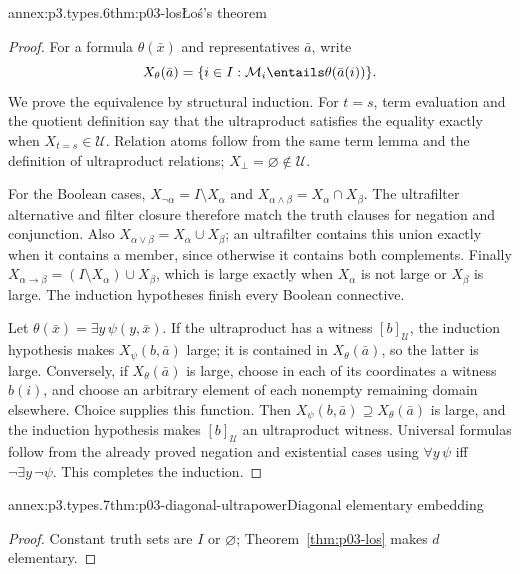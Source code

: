 \begin{annexitem}{annex:p3.types.6}{thm:p03-los}{\L o\'s's theorem}
\begin{proof}
For a formula \(\theta(\bar x)\) and representatives \(\bar a\), write
\[
 X_\theta(\bar a)=
 \{i\in I:\mathcal M_i\entails\theta(\bar a(i))\}.
\]
We prove the equivalence by structural induction.  For \(t=s\), term
evaluation and the quotient definition say that the ultraproduct satisfies
the equality exactly when \(X_{t=s}\in\mathcal U\).  Relation atoms follow
from the same term lemma and the definition of ultraproduct relations;
\(X_\bot=\varnothing\notin\mathcal U\).

For the Boolean cases,
\(X_{\neg\alpha}=I\setminus X_\alpha\) and
\(X_{\alpha\land\beta}=X_\alpha\cap X_\beta\).  The ultrafilter alternative
and filter closure therefore match the truth clauses for negation and
conjunction.  Also
\(X_{\alpha\lor\beta}=X_\alpha\cup X_\beta\); an ultrafilter contains this
union exactly when it contains a member, since otherwise it contains both
complements.  Finally
\(X_{\alpha\to\beta}=(I\setminus X_\alpha)\cup X_\beta\), which is large
exactly when \(X_\alpha\) is not large or \(X_\beta\) is large.  The
induction hypotheses finish every Boolean connective.

Let \(\theta(\bar x)=\exists y\,\psi(y,\bar x)\).  If the ultraproduct has a
witness \([b]_{\mathcal U}\), the induction hypothesis makes
\(X_\psi(b,\bar a)\) large; it is contained in \(X_\theta(\bar a)\), so the
latter is large.  Conversely, if \(X_\theta(\bar a)\) is large, choose in
each of its coordinates a witness \(b(i)\), and choose an arbitrary element
of each nonempty remaining domain elsewhere.  Choice supplies this function.
Then \(X_\psi(b,\bar a)\supseteq X_\theta(\bar a)\) is large, and the
induction hypothesis makes \([b]_{\mathcal U}\) an ultraproduct witness.
Universal formulas follow from the already proved negation and existential
cases using \(\forall y\,\psi\) iff \(\neg\exists y\,\neg\psi\).  This
completes the induction.
\end{proof}
\end{annexitem}

\begin{annexitem}{annex:p3.types.7}{thm:p03-diagonal-ultrapower}{Diagonal elementary embedding}
\begin{proof}
Constant truth sets are \(I\) or \(\varnothing\);
Theorem~\ref{thm:p03-los} makes \(d\) elementary.
\end{proof}
\end{annexitem}

